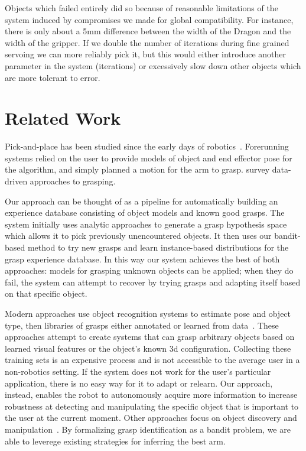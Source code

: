\documentclass{article}
\begin{document}
Objects which failed entirely did so because of reasonable limitations of the
system induced by compromises we made for global compatibility. For instance,
there is only about a 5mm difference between the width of the Dragon and the width of 
the gripper. If we double the number of iterations
during fine grained servoing we can more reliably pick it, but this would either
introduce another parameter in the system (iterations) or excessively slow down
other objects which are more tolerant to error.


\section{Related Work}

\label{sec:relatedwork}


Pick-and-place has been studied since the early days of
robotics~\citep{brooks83, lozano89}.  Forerunning systems relied on the user to
provide models of object and end effector pose for the algorithm, and simply
planned a motion for the arm to grasp.  \citet{bohg13} survey data-driven
approaches to grasping.  

Our approach can be thought of as a pipeline for
automatically building an experience database consisting of object models and
known good grasps.  The system initially uses analytic approaches to generate a
grasp hypothesis space which allows it to pick previously unencountered
objects. It then uses our bandit-based method to try new grasps and learn
instance-based distributions for the grasp experience database.  In this way
our system achieves the best of both approaches: models for grasping unknown
objects can be applied; when they do fail, the system can attempt to recover by
trying grasps and adapting itself based on that specific object.  

Modern approaches use object recognition systems to estimate pose and
object type, then libraries of grasps either annotated or learned from
data~\citep{saxena08, goldfeder09, morales03,ciocarlie14}.  These
approaches attempt to create systems that can grasp arbitrary objects
based on learned visual features or the object's known 3d
configuration.  Collecting these training sets is an expensive process
and is not accessible to the average user in a non-robotics
setting. If the system does not work for the user's particular
application, there is no easy way for it to adapt or relearn.  Our
approach, instead, enables the robot to autonomously acquire more
information to increase robustness at detecting and manipulating the
specific object that is important to the user at the current moment.
Other approaches focus on object discovery and
manipulation~\citep{lyubova13, kraft10, collet14, schiebener12}.  By
formalizing grasp identification as a bandit problem, we are able to
leverege existing strategies for inferring the best arm.
\end{document}
